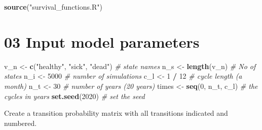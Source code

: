 \documentclass[
]{article}
\newenvironment{Shaded}{\begin{snugshade}}{\end{snugshade}}
\newcommand{\CommentTok}[1]{\textcolor[rgb]{0.56,0.35,0.01}{\textit{#1}}}
\newcommand{\DecValTok}[1]{\textcolor[rgb]{0.00,0.00,0.81}{#1}}
\newcommand{\KeywordTok}[1]{\textcolor[rgb]{0.13,0.29,0.53}{\textbf{#1}}}
\newcommand{\NormalTok}[1]{#1}
\newcommand{\OperatorTok}[1]{\textcolor[rgb]{0.81,0.36,0.00}{\textbf{#1}}}
\newcommand{\StringTok}[1]{\textcolor[rgb]{0.31,0.60,0.02}{#1}}
\begin{document}
\begin{Shaded}
\begin{Highlighting}[]
\KeywordTok{source}\NormalTok{(}\StringTok{"survival_functions.R"}\NormalTok{)}
\end{Highlighting}
\end{Shaded}

\hypertarget{input-model-parameters}{%
\section{03 Input model parameters}\label{input-model-parameters}}

\begin{Shaded}
\begin{Highlighting}[]
\NormalTok{v_n       <-}\StringTok{ }\KeywordTok{c}\NormalTok{(}\StringTok{"healthy"}\NormalTok{, }\StringTok{"sick"}\NormalTok{, }\StringTok{"dead"}\NormalTok{)  }\CommentTok{# state names}
\NormalTok{n_s       <-}\StringTok{ }\KeywordTok{length}\NormalTok{(v_n)                   }\CommentTok{# No of states }
\NormalTok{n_i       <-}\StringTok{ }\DecValTok{5000}                          \CommentTok{# number of simulations }
\NormalTok{c_l       <-}\StringTok{ }\DecValTok{1} \OperatorTok{/}\StringTok{ }\DecValTok{12}                        \CommentTok{# cycle length (a month)}
\NormalTok{n_t       <-}\StringTok{ }\DecValTok{30}                            \CommentTok{# number of years (20 years)}
\NormalTok{times     <-}\StringTok{ }\KeywordTok{seq}\NormalTok{(}\DecValTok{0}\NormalTok{, n_t, c_l)              }\CommentTok{# the cycles in years}
\KeywordTok{set.seed}\NormalTok{(}\DecValTok{2020}\NormalTok{)                             }\CommentTok{# set the seed}
\end{Highlighting}
\end{Shaded}

Create a transition probability matrix with all transitions indicated
and numbered.
\end{document}
